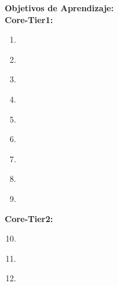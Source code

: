 \noindent \textbf{Objetivos de Aprendizaje:}\\
\noindent \textbf{Core-Tier1:}
\begin{enumerate}
	\setcounter{enumi}{0}
	\item \ALFundamentalDataStructuresandAlgorithmsLOImplement\xspace[\ALFundamentalDataStructuresandAlgorithmsLOImplementLevel]\label{sec:BOK:ALFundamentalDataStructuresandAlgorithmsLOImplement}
	\item \ALFundamentalDataStructuresandAlgorithmsLOImplementSimple\xspace[\ALFundamentalDataStructuresandAlgorithmsLOImplementSimpleLevel]\label{sec:BOK:ALFundamentalDataStructuresandAlgorithmsLOImplementSimple}
	\item \ALFundamentalDataStructuresandAlgorithmsLOBe\xspace[\ALFundamentalDataStructuresandAlgorithmsLOBeLevel]\label{sec:BOK:ALFundamentalDataStructuresandAlgorithmsLOBe}
	\item \ALFundamentalDataStructuresandAlgorithmsLODescribeTheHash\xspace[\ALFundamentalDataStructuresandAlgorithmsLODescribeTheHashLevel]\label{sec:BOK:ALFundamentalDataStructuresandAlgorithmsLODescribeTheHash}
	\item \ALFundamentalDataStructuresandAlgorithmsLODiscuss\xspace[\ALFundamentalDataStructuresandAlgorithmsLODiscussLevel]\label{sec:BOK:ALFundamentalDataStructuresandAlgorithmsLODiscuss}
	\item \ALFundamentalDataStructuresandAlgorithmsLODiscussFactors\xspace[\ALFundamentalDataStructuresandAlgorithmsLODiscussFactorsLevel]\label{sec:BOK:ALFundamentalDataStructuresandAlgorithmsLODiscussFactors}
	\item \ALFundamentalDataStructuresandAlgorithmsLOExplainHow\xspace[\ALFundamentalDataStructuresandAlgorithmsLOExplainHowLevel]\label{sec:BOK:ALFundamentalDataStructuresandAlgorithmsLOExplainHow}
	\item \ALFundamentalDataStructuresandAlgorithmsLOSolveProblems\xspace[\ALFundamentalDataStructuresandAlgorithmsLOSolveProblemsLevel]\label{sec:BOK:ALFundamentalDataStructuresandAlgorithmsLOSolveProblems}
	\item \ALFundamentalDataStructuresandAlgorithmsLODemonstrate\xspace[\ALFundamentalDataStructuresandAlgorithmsLODemonstrateLevel]\label{sec:BOK:ALFundamentalDataStructuresandAlgorithmsLODemonstrate}
\end{enumerate}
\noindent \textbf{Core-Tier2:}
\begin{enumerate}
	\setcounter{enumi}{9}
	\item \ALFundamentalDataStructuresandAlgorithmsLODescribeTheAnd\xspace[\ALFundamentalDataStructuresandAlgorithmsLODescribeTheAndLevel]\label{sec:BOK:ALFundamentalDataStructuresandAlgorithmsLODescribeTheAnd}
	\item \ALFundamentalDataStructuresandAlgorithmsLOSolveProblemsAlgorithms\xspace[\ALFundamentalDataStructuresandAlgorithmsLOSolveProblemsAlgorithmsLevel]\label{sec:BOK:ALFundamentalDataStructuresandAlgorithmsLOSolveProblemsAlgorithms}
	\item \ALFundamentalDataStructuresandAlgorithmsLOTrace\xspace[\ALFundamentalDataStructuresandAlgorithmsLOTraceLevel]\label{sec:BOK:ALFundamentalDataStructuresandAlgorithmsLOTrace}
\end{enumerate}



